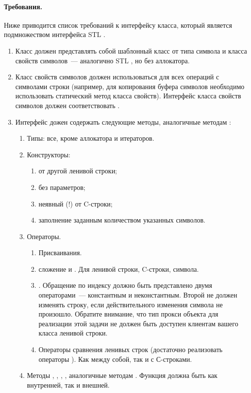 \documentclass[a4paper,10pt]{article}
\begin{document}
\paragraph{Требования.}
Ниже приводится список требований к интерфейсу класса,
который является подмножеством интерфейса STL .

\begin{enumerate}
 \item Класс  должен представлять собой шаблонный класс от типа символа и класса свойств символов~--- аналогично STL , но без аллокатора.
 
 \item Класс свойств символов должен использоваться для всех операций с символами строки
 (например, для копирования буфера символов необходимо использовать статический метод  класса свойств).
 Интерфейс класса свойств символов должен соответствовать .
 
 \item Интерфейс  дожен содержать следующие методы, аналогичные методам :

  \begin{enumerate}
   \item Типы: все, кроме аллокатора и итераторов.
   \item Конструкторы:
    \begin{enumerate}
     \item от другой ленивой строки;
     \item без параметров;
     \item неявный (!) от C-строки;
     \item заполнение заданным количеством указанных символов.
    \end{enumerate}
   \item Операторы.
    \begin{enumerate}
     \item Присваивания. %
     \item сложение \cpp{+=} и \cpp{+}. Для ленивой строки, C-строки, символа.
     \item \cpp{[]}. Обращение по индексу должно быть представлено двумя операторами~---
     константным и неконстантным.
     Второй не должен изменять строку, если действительного изменения символа не произошло.
     Обратите внимание, что тип прокси объекта для реализации этой задачи не должен быть доступен клиентам вашего класса ленивой строки.
     \item Операторы сравнения ленивых строк (достаточно реализовать операторы \cpp{==, !=, <}). Как между собой, так и с С-строками.
   \end{enumerate}
   \item Методы , , , ,  аналогичные методам . Функция  должна быть как внутренней, так и внешней.
   

\end{enumerate}
\end{enumerate}
\end{document}
